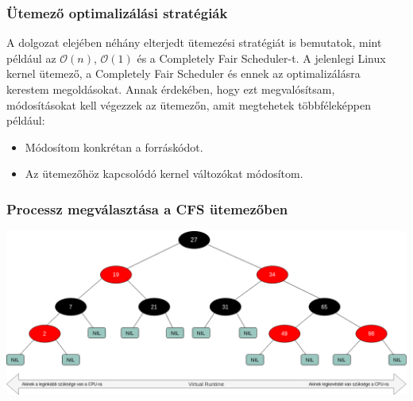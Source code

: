 \documentclass{beamer}
\begin{document}
\begin{frame}
\frametitle{Ütemező optimalizálási stratégiák}
A dolgozat elejében néhány elterjedt ütemezési stratégiát is bemutatok, mint például az $\mathcal{O}(n)$, $\mathcal{O}(1)$ és a Completely Fair Scheduler-t.
A jelenlegi Linux kernel ütemező, a Completely Fair Scheduler és ennek az optimalizálásra kerestem megoldásokat.
Annak érdekében, hogy ezt megvalósítsam, módosításokat kell végezzek az ütemezőn, amit megtehetek többféleképpen például:
\begin{itemize}
\pause
\item Módosítom konkrétan a forráskódot.
\pause
\item Az ütemezőhöz kapcsolódó kernel változókat módosítom.
\end{itemize}
\end{frame}

\begin{frame}
\frametitle{Processz megválasztása a CFS ütemezőben}
\begin{center}
\includegraphics[scale=0.25]{./images/redBlackTree.png}
\end{center}
\end{frame}
\end{document}
